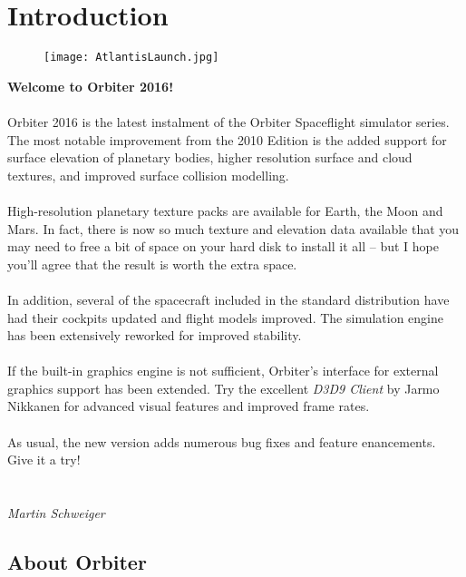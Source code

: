 \documentclass[Orbiter User Manual.tex]{subfiles}
\begin{document}
\section{Introduction}

\begin{figure}[H]
  \centering
  \texttt{[image: AtlantisLaunch.jpg]}
\end{figure}

\textbf{Welcome to Orbiter 2016!}\\
\\
Orbiter 2016 is the latest instalment of the Orbiter Spaceflight simulator series. The most notable improvement from the 2010 Edition is the added support for surface elevation of planetary bodies, higher resolution surface and cloud textures, and improved surface collision modelling.\\
\\
High-resolution planetary texture packs are available for Earth, the Moon and Mars. In fact, there is now so much texture and elevation data available that you may need to free a bit of space on your hard disk to install it all – but I hope you'll agree that the result is worth the extra space.\\
\\
In addition, several of the spacecraft included in the standard distribution have had their cockpits updated and flight models improved. The simulation engine has been extensively reworked for improved stability.\\
\\
If the built-in graphics engine is not sufficient, Orbiter's interface for external graphics support has been extended. Try the excellent \textit{D3D9 Client} by Jarmo Nikkanen for advanced visual features and improved frame rates.\\
\\
As usual, the new version adds numerous bug fixes and feature enancements. Give it a try!\\
\\
\\
\textit{Martin Schweiger}



\subsection{About Orbiter}
\end{document}
